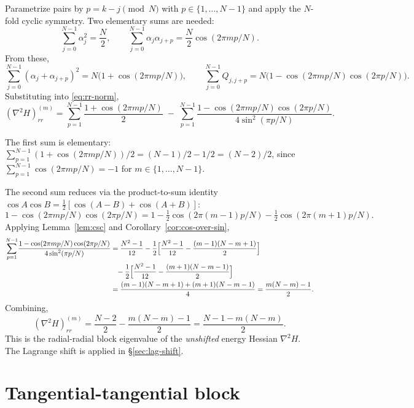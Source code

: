 \documentclass[11pt]{article}
\theoremstyle{remark}
\begin{document}
Parametrize pairs by $p = k - j \pmod N$ with $p \in \{1, \ldots, N-1\}$
and apply the $N$-fold cyclic symmetry. Two elementary sums are needed:
\[
  \sum_{j=0}^{N-1} \alpha_j^2 = \frac{N}{2},
  \qquad
  \sum_{j=0}^{N-1} \alpha_j \alpha_{j+p} = \frac{N}{2}\cos(2\pi m p / N).
\]
From these,
\[
  \sum_{j=0}^{N-1} (\alpha_j + \alpha_{j+p})^2
     = N \bigl(1 + \cos(2\pi m p / N)\bigr),
  \qquad
  \sum_{j=0}^{N-1} Q_{j, j+p}
     = N \bigl(1 - \cos(2\pi m p / N) \cos(2\pi p / N)\bigr).
\]
Substituting into \eqref{eq:rr-norm},
\begin{equation}\label{eq:rr-intermediate}
  (\nabla^2 H)_{rr}^{(m)}
     = \sum_{p=1}^{N-1} \frac{1 + \cos(2\pi m p / N)}{2}
       \;-\; \sum_{p=1}^{N-1} \frac{1 - \cos(2\pi m p / N)\cos(2\pi p / N)}
                                   {4 \sin^2(\pi p / N)}.
\end{equation}

The first sum is elementary:
$\sum_{p=1}^{N-1} (1 + \cos(2\pi m p / N))/2 = (N-1)/2 - 1/2 = (N-2)/2$,
since $\sum_{p=1}^{N-1} \cos(2\pi m p / N) = -1$ for $m \in \{1, \ldots, N-1\}$.

The second sum reduces via the product-to-sum identity
$\cos A \cos B = \tfrac12[\cos(A-B) + \cos(A+B)]$:
\[
  1 - \cos(2\pi m p / N)\cos(2\pi p / N)
     = 1 - \tfrac12 \cos(2\pi(m-1) p / N) - \tfrac12 \cos(2\pi(m+1) p / N).
\]
Applying Lemma~\ref{lem:csc} and Corollary~\ref{cor:cos-over-sin},
\begin{align*}
  \sum_{p=1}^{N-1}\!\frac{1 - \cos(2\pi m p / N)\cos(2\pi p / N)}{4 \sin^2(\pi p / N)}
  &= \frac{N^2 - 1}{12}
     - \frac{1}{2}\Bigl[\frac{N^2 - 1}{12} - \frac{(m-1)(N-m+1)}{2}\Bigr] \\
  &\phantom{=} - \frac{1}{2}\Bigl[\frac{N^2 - 1}{12} - \frac{(m+1)(N-m-1)}{2}\Bigr] \\
  &= \frac{(m-1)(N-m+1) + (m+1)(N-m-1)}{4}
   = \frac{m(N-m) - 1}{2}.
\end{align*}
Combining,
\begin{equation}\label{eq:rr-unshifted}
  (\nabla^2 H)_{rr}^{(m)}
     = \frac{N - 2}{2} - \frac{m(N-m) - 1}{2}
     = \frac{N - 1 - m(N-m)}{2}.
\end{equation}
This is the radial-radial block eigenvalue of the \emph{unshifted}
energy Hessian $\nabla^2 H$. The Lagrange shift is applied in
\S\ref{sec:lag-shift}.

\section{Tangential-tangential block}\label{sec:tt}
\end{document}
